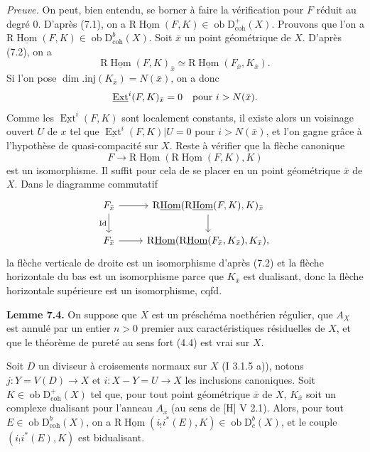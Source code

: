 \documentclass[11pt]{article}
\DeclareMathOperator{\Hom}{Hom}
\DeclareMathOperator{\Ext}{Ext}
\newcommand{\R}{\mathrm{R}}\newcommand{\RHomCore}{\mathrm{RHom}}
\newcommand{\D}{\mathrm{D}}
\newcommand{\ob}{\operatorname{ob}}
\providecommand{\Hom}{\operatorname{Hom}}
\providecommand{\ob}{\operatorname{ob}}
\providecommand{\R}{\mathrm R}
\providecommand{\Hom}{\operatorname{Hom}}
\begin{document}
\emph{Preuve.} On peut, bien entendu, se borner à faire la vérification pour $F$ réduit au degré $0$. D'après (7.1), on a $\R\underline{\Hom}(F,K)\in\ob\D^{+}_{\mathrm{coh}}(X)$. Prouvons que l'on a $\R\underline{\Hom}(F,K)\in\ob\D^{b}_{\mathrm{coh}}(X)$. Soit $\bar{x}$ un point géométrique de $X$. D'après (7.2), on a
\[
        \R\underline{\Hom}(F,K)_{\bar{x}}\simeq \R\underline{\Hom}(F_{\bar{x}},K_{\bar{x}}).
\]
Si l'on pose $\dim.\mathrm{inj}(K_{\bar{x}})=N(\bar{x})$, on a donc
\[
        \underline{\Ext}^i(F,K)_{\bar{x}}=0\quad\hbox{pour }i>N(\bar{x}).
\]
Comme les $\underline{\Ext}^{i}(F,K)$ sont localement constants, il existe alors un voisinage ouvert $U$ de $x$ tel que $\underline{\Ext}^{i}(F,K)|U=0$ pour $i>N(\bar{x})$, et l'on gagne grâce à l'hypothèse de quasi-compacité sur $X$. Reste à vérifier que la flèche canonique
\[
        F\longrightarrow \R\underline{\Hom}(\R\underline{\Hom}(F,K),K)
\]
est un isomorphisme. Il suffit pour cela de se placer en un point géométrique $\bar{x}$ de $X$. Dans le diagramme commutatif
\[
\begin{tikzcd}
F_{\bar{x}} \arrow[r] \arrow[d,"\mathrm{Id}"'] & \R\underline{\Hom}(\R\underline{\Hom}(F,K),K)_{\bar{x}} \arrow[d]\\
F_{\bar{x}} \arrow[r] & \R\underline{\Hom}(\R\underline{\Hom}(F_{\bar{x}},K_{\bar{x}}),K_{\bar{x}}),
\end{tikzcd}
\]
la flèche verticale de droite est un isomorphisme d'après (7.2) et la flèche horizontale du bas est un isomorphisme parce que $K_{\bar{x}}$ est dualisant, donc la flèche horizontale supérieure est un isomorphisme, cqfd.

\textbf{Lemme 7.4.} On suppose que $X$ est un préschéma noethérien régulier, que $A_X$ est annulé par un entier $n>0$ premier aux caractéristiques résiduelles de $X$, et que le théorème de pureté au sens fort (4.4) est vrai sur $X$.

Soit $D$ un diviseur à croisements normaux sur $X$ (I 3.1.5 a)), notons $j:Y=V(D)\to X$ et $i:X-Y=U\to X$ les inclusions canoniques. Soit $K\in\ob\D^{+}_{\mathrm{coh}}(X)$ tel que, pour tout point géométrique $\bar{x}$ de $X$, $K_{\bar{x}}$ soit un complexe dualisant pour l'anneau $A_{\bar{x}}$ (au sens de [H] V 2.1). Alors, pour tout $E\in\ob\D^{b}_{\mathrm{coh}}(X)$, on a $\R\underline{\Hom}(i_!i^*(E),K)\in\ob\D^{b}_{c}(X)$, et le couple $(i_!i^*(E),K)$ est bidualisant.
\end{document}
